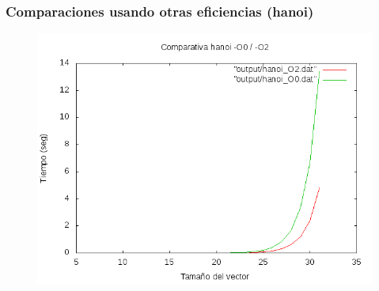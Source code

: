 \documentclass[spanish]{beamer}
\begin{document}
    
\begin{frame}\frametitle{Comparaciones usando otras eficiencias (hanoi)}
  \begin{figure}[H]
    \centering   
        \includegraphics[clip,width=1\columnwidth]{../../plots/hanoi_comparativa.png}%
      \end{figure}
  \end{frame}
\end{document}
